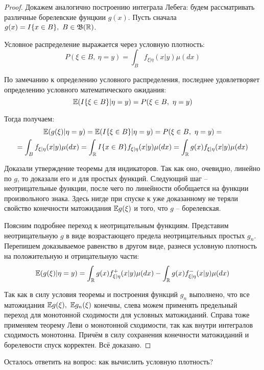 \begin{proof}
    Докажем аналогично построению интеграла Лебега: будем рассматривать различные борелевские фунцкии $g(x)$. Пусть сначала $g(x) = I\{x \in B\},\ B \in \mathfrak{B}(\mathbb{R})$.
    
    Условное распределение выражается через условную плотность:
    \[
        P(\xi \in B,\ \eta = y) = \int_B f_{\xi | \eta}(x | y) \mu(dx)
    \]

    По замечанию к определению условного распределения, последнее удовлетворяет определению условного математического ожидания:
    \[
        \E(I\{\xi \in B\} | \eta = y) = P(\xi \in B,\ \eta = y)
    \]
    
    Тогда получаем:
    \begin{multline*}
        \mathbb{E}(g(\xi) | \eta=y) = \mathbb{E}(I\{\xi \in B\} | \eta = y) = P(\xi \in B,\ \eta = y) =
        \\
        = \int_B f_{\xi | \eta}(x | y) \mu(dx) = \int_{\mathbb{R}} I\{x \in B\} f_{\xi | \eta}(x | y) \mu(dx) = \int_{\mathbb{R}} g(x) f_{\xi | \eta}(x | y) \mu(dx)
    \end{multline*}

    Доказали утверждение теоремы для индикаторов. Так как оно, очевидно, линейно по $g$, то доказали его и для простых функций. Следующий шаг -- неотрицательные функции, после чего по линейности обобщается на функции произвольного знака. Здесь нигде при спуске к уже доказанному не теряли свойство конечности матожидания $\mathbb{E} g(\xi)$ и того, что $g$ -- борелевская.

    Поясним подробнее переход к неотрицательным функциям. Представим неотрицательную $g$ в виде возрастающего предела неотрицательных простых $g_n$. Перепишем доказываемое равенство в другом виде, разнеся условную плотность на положительную и отрицательную части:
    \[
        \mathbb{E}(g(\xi) | \eta = y) = \int_{\mathbb{R}} g(x) f^+_{\xi | \eta}(x | y) \mu(dx) - \int_{\mathbb{R}} g(x) f^-_{\xi | \eta}(x | y) \mu(dx)
    \]

    Так как в силу условия теоремы и построения функций $g_n$ выполнено, что все матожидания $\mathbb{E} g(\xi),\ \mathbb{E} g_n(\xi)$ конечны, слева можем применять предельный переход для монотонной сходимости для условных матожиданий. Справа тоже применяем теорему Леви о монотонной сходимости, так как внутри интегралов сходимость монотонна. Причём в силу сохранения конечности матожиданий и борелевости спуск корректен. Всё доказано.
\end{proof}

\begin{note}
    Осталось ответить на вопрос: как вычислить условную плотность?
\end{note}


